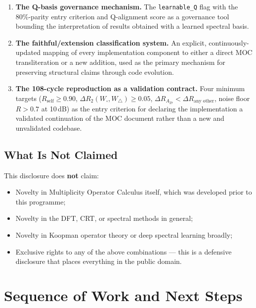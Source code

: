 \documentclass[11pt,a4paper]{article}
\theoremstyle{plain}
\theoremstyle{definition}
\theoremstyle{remark}
\begin{document}
\begin{enumerate}[leftmargin=1.5em,itemsep=4pt]
  \item \textbf{The Q-basis governance mechanism.} The \texttt{learnable\_Q} flag with the
    80\%-parity entry criterion and Q-alignment score as a governance tool bounding the
    interpretation of results obtained with a learned spectral basis.

  \item \textbf{The faithful/extension classification system.} An explicit, continuously-updated
    mapping of every implementation component to either a direct MOC transliteration or a
    new addition, used as the primary mechanism for preserving structural claims through code evolution.

  \item \textbf{The 108-cycle reproduction as a validation contract.} Four minimum targets
    ($R_{\mathrm{self}} \ge 0.90$, $\Delta R_2(W_\square, W_\triangle) \ge 0.05$,
    $\Delta R_{A_{27}} < \Delta R_{\text{any other}}$, noise floor $R > 0.7$ at 10\,dB)
    as the entry criterion for declaring the implementation a validated continuation of
    the MOC document rather than a new and unvalidated codebase.
\end{enumerate}

\subsection{What Is Not Claimed}

This disclosure does \textbf{not} claim:
\begin{itemize}[itemsep=2pt]
  \item Novelty in Multiplicity Operator Calculus itself, which was developed prior to this programme;
  \item Novelty in the DFT, CRT, or spectral methods in general;
  \item Novelty in Koopman operator theory or deep spectral learning broadly;
  \item Exclusive rights to any of the above combinations --- this is a defensive disclosure
    that places everything in the public domain.
\end{itemize}

\section{Sequence of Work and Next Steps}
\end{document}
